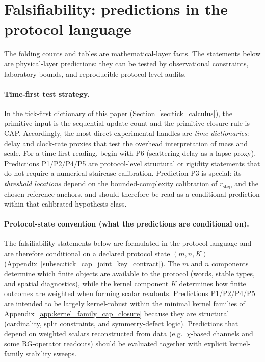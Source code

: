 
\section{Falsifiability: predictions in the protocol language}
\label{sec:falsifiability}
\label{sec:falsifiability_predictions}

The folding counts and tables are mathematical-layer facts.
The statements below are physical-layer predictions: they can be tested by observational constraints, laboratory bounds, and reproducible protocol-level audits.

\paragraph{Time-first test strategy.}
In the tick-first dictionary of this paper (Section~\ref{sec:tick_calculus}), the primitive input is the sequential update count and the primitive closure rule is CAP.
Accordingly, the most direct experimental handles are \emph{time dictionaries}: delay and clock-rate proxies that test the overhead interpretation of mass and scale.
For a time-first reading, begin with P6 (scattering delay as a lapse proxy).
Predictions P1/P2/P4/P5 are protocol-level structural or rigidity statements that do not require a numerical staircase calibration.
Prediction P3 is special: its \emph{threshold locations} depend on the bounded-complexity calibration of $r_{\mathrm{step}}$ and the chosen reference anchors, and should therefore be read as a conditional prediction within that calibrated hypothesis class.

\paragraph{Protocol-state convention (what the predictions are conditional on).}
\AuditTag The falsifiability statements below are formulated in the protocol language and are therefore conditional on a declared protocol state $(m,n,K)$ (Appendix~\ref{subsec:tick_cap_joint_key_contract}).
The $m$ and $n$ components determine which finite objects are available to the protocol (words, stable types, and spatial diagnostics), while the kernel component $K$ determines how finite outcomes are weighted when forming scalar readouts.
\AuditTag Predictions P1/P2/P4/P5 are intended to be largely kernel-robust within the minimal kernel families of Appendix~\ref{app:kernel_family_cap_closure} because they are structural (cardinality, split constraints, and symmetry-defect logic).
Predictions that depend on weighted scalars reconstructed from data (e.g.\ $\chi$-based channels and some RG-operator readouts) should be evaluated together with explicit kernel-family stability sweeps.

